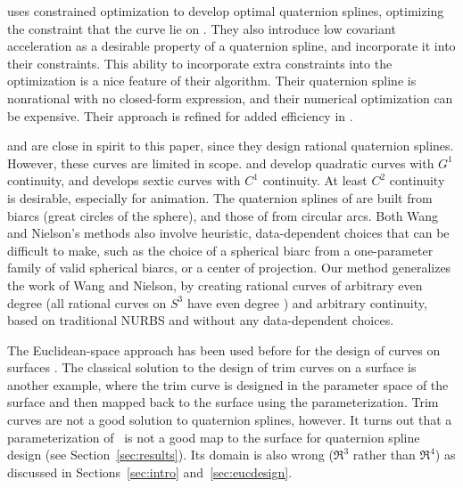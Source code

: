 \documentclass[11pt]{article}
\begin{document}
\cite{barr92} uses constrained optimization to develop optimal
quaternion splines, optimizing the constraint that the curve lie on .
They also introduce low covariant acceleration
as a desirable property of a quaternion spline,
and incorporate it into their constraints.
This ability to incorporate extra constraints into the optimization
is a nice feature of their algorithm.
Their quaternion spline is nonrational with no closed-form expression,
and their numerical optimization can be expensive.
Their approach is refined for added efficiency in \cite{rama97}.

\cite{wang93, wang94} and \cite{nielson93} are close in spirit 
to this paper, since they design rational quaternion splines.
However, these curves are limited in scope.
\cite{wang93,wang94} and \cite{nielson93} develop quadratic curves
with $G^1$ continuity, and \cite{wang94} develops sextic curves
with $C^1$ continuity.
At least $C^2$ continuity is desirable, especially for animation.
The quaternion splines of \cite{wang93} are built from biarcs 
(great circles of the sphere), and those of \cite{nielson93} from circular arcs.
Both Wang and Nielson's methods also involve heuristic, data-dependent choices
that can be difficult to make,
such as the choice of a spherical biarc from
a one-parameter family of valid spherical biarcs, or a center of projection.
Our method generalizes the work of Wang and Nielson, 
by creating rational curves of arbitrary even degree 
(all rational curves on $S^3$ have even degree \cite{wang94}) 
and arbitrary continuity,
based on traditional NURBS and without any data-dependent choices.

The Euclidean-space approach has been used before
for the design of curves on surfaces \cite{dietz93,wang94}.
The classical solution to the design of trim curves on a surface 
is another example, where the trim curve is designed in the parameter space 
of the surface and then mapped back to the surface using the
parameterization. %
Trim curves are not a good solution to quaternion splines, however.
It turns out that a parameterization of \ is not a good map
to the surface for quaternion spline design (see Section~\ref{sec:results}).
Its domain is also wrong ($\Re^3$ rather than $\Re^4$) as discussed
in Sections~\ref{sec:intro} and~\ref{sec:eucdesign}.
\end{document}

